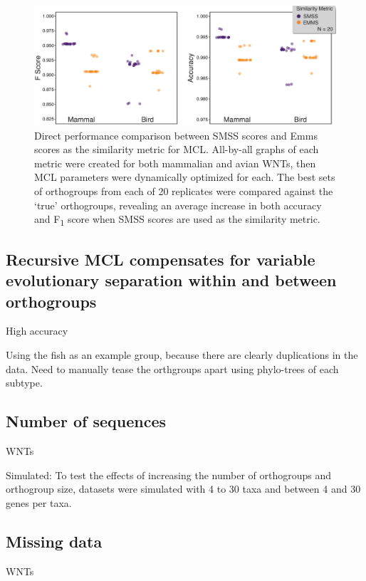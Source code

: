 \documentclass[twocolumn]{bmcart}  %
\begin{document}
\begin{figure}[t]
  \begin{center}
  \includegraphics[height=0.25\textheight]{../figures/emms_vs_smss.eps}
\end{center}
\caption{Direct performance comparison between SMSS scores and Emms scores as the similarity metric for MCL. All-by-all graphs of each metric were created for both mammalian and avian WNTs, then MCL parameters were dynamically optimized for each. The best sets of orthogroups from each of 20 replicates were compared against the `true' orthogroups, revealing an average increase in both accuracy and F\textsubscript{1} score when SMSS scores are used as the similarity metric.}
\label{fig:emms_vs_smss}
\end{figure}


\subsection{Recursive MCL compensates for variable evolutionary separation within and between orthogroups}\label{subsec:recursiveMclCompensatesForVariableEvolutionarySeparationBetweenOrthogroups}
High accuracy

Using the fish as an example group, because there are clearly duplications in the data.
Need to manually tease the orthgroups apart using phylo-trees of each subtype.

\subsection{Number of sequences}
WNTs

Simulated: To test the effects of increasing the number of orthogroups and orthogroup size, datasets were simulated with 4 to 30 taxa and between 4 and 30 genes per taxa.


\subsection{Missing data}
WNTs
\end{document}
